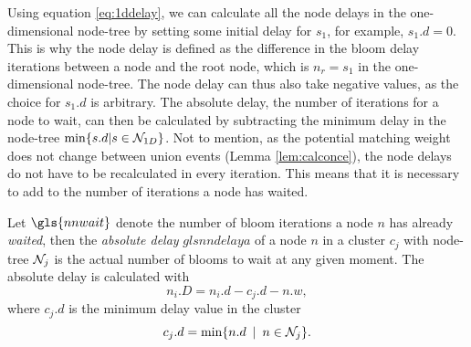 Using equation \eqref{eq:1ddelay}, we can calculate all the node delays in the one-dimensional node-tree by setting some initial delay for $s_1$, for example, $s_1.d=0$. This is why the node delay is defined as the difference in the bloom delay iterations between a node and the root node, which is $n_r=s_1$ in the one-dimensional node-tree. The node delay can thus also take negative values, as the choice for $s_1.d$ is arbitrary. The absolute delay, the number of iterations for a node to wait, can then be calculated by subtracting the minimum delay in the node-tree $\min \{s.d | s \in \mathcal{N}_{1D}\}$. Not to mention, as the potential matching weight does not change between union events (Lemma \ref{lem:calconce}), the node delays do not have to be recalculated in every iteration. This means that it is necessary to add to the number of iterations a node has waited.
\begin{definition}\label{def:absolutedelay}
  Let $\gls{nnwait}$ denote the number of bloom iterations a node $n$ has already \emph{waited}, then the \emph{absolute delay} $gls{nndelaya}$ of a node $n$ in a cluster $c_j$ with node-tree $\mathcal{N}_j$ is the actual number of blooms to wait at any given moment. The absolute delay is calculated with
  \begin{equation}\label{eq:absulutedelay}
    n_i.D = n_i.d - c_j.d - n.w, 
  \end{equation}
  where $c_j.d$ is the minimum delay value in the cluster
  \begin{equation}\label{eq:cd}
    c_j.d = \min \{n.d \hspace{.5em} | \hspace{.5em} n\in \mathcal{N}_j\}.
  \end{equation}
\end{definition}
